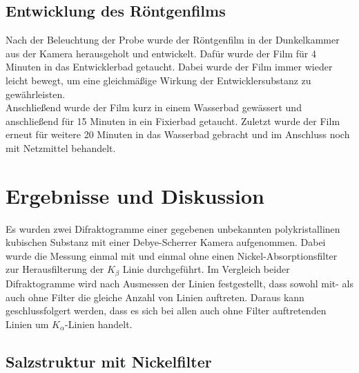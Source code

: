 \documentclass[a4paper,twoside,final]{article}
\begin{document}
\subsection{Entwicklung des Röntgenfilms}
Nach der Beleuchtung der Probe wurde der Röntgenfilm in der Dunkelkammer aus der Kamera herausgeholt und entwickelt. Dafür wurde der Film für 4 Minuten in das Entwicklerbad getaucht. Dabei wurde der Film immer wieder leicht bewegt, um eine gleichmäßige Wirkung der Entwicklersubstanz zu gewährleisten.\\
Anschließend wurde der Film kurz in einem Wasserbad gewässert und anschließend für 15 Minuten in ein Fixierbad getaucht. Zuletzt wurde der Film erneut für weitere 20 Minuten in das Wasserbad gebracht und im Anschluss noch mit Netzmittel behandelt.


\newpage
\section{Ergebnisse und Diskussion}
Es wurden zwei Difraktogramme einer gegebenen unbekannten polykristallinen kubischen Substanz mit einer Debye-Scherrer Kamera aufgenommen. Dabei wurde die Messung einmal mit und einmal ohne einen Nickel-Absorptionsfilter zur Herausfilterung der $K_{\beta}$ Linie durchgeführt. Im Vergleich beider Difraktogramme wird nach Ausmessen der Linien festgestellt, dass sowohl mit- als auch ohne Filter die gleiche Anzahl von Linien auftreten. Daraus kann geschlussfolgert werden, dass es sich bei allen auch ohne Filter auftretenden Linien um $K_{\alpha}$-Linien handelt.
\subsection{Salzstruktur mit Nickelfilter}
\end{document}
